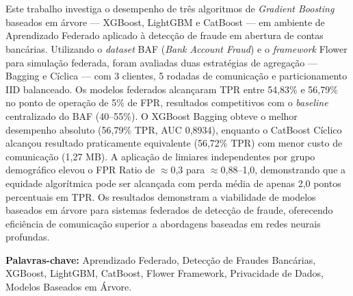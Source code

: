 \section*{}

Este trabalho investiga o desempenho de três algoritmos de \textit{Gradient Boosting} baseados em árvore --- XGBoost, LightGBM e CatBoost --- em ambiente de Aprendizado Federado aplicado à detecção de fraude em abertura de contas bancárias. Utilizando o \textit{dataset} BAF (\textit{Bank Account Fraud}) e o \textit{framework} Flower para simulação federada, foram avaliadas duas estratégias de agregação --- Bagging e Cíclica --- com 3 clientes, 5 rodadas de comunicação e particionamento IID balanceado. Os modelos federados alcançaram TPR entre 54,83\% e 56,79\% no ponto de operação de 5\% de FPR, resultados competitivos com o \textit{baseline} centralizado do BAF (40--55\%). O XGBoost Bagging obteve o melhor desempenho absoluto (56,79\% TPR, AUC 0,8934), enquanto o CatBoost Cíclico alcançou resultado praticamente equivalente (56,72\% TPR) com menor custo de comunicação (1,27 MB). A aplicação de limiares independentes por grupo demográfico elevou o FPR Ratio de $\approx$0,3 para $\approx$0,88--1,0, demonstrando que a equidade algorítmica pode ser alcançada com perda média de apenas 2,0 pontos percentuais em TPR. Os resultados demonstram a viabilidade de modelos baseados em árvore para sistemas federados de detecção de fraude, oferecendo eficiência de comunicação superior a abordagens baseadas em redes neurais profundas.

{\bf Palavras-chave:} Aprendizado Federado, Detecção de Fraudes Bancárias, XGBoost, LightGBM, CatBoost, Flower Framework, Privacidade de Dados, Modelos Baseados em Árvore.
